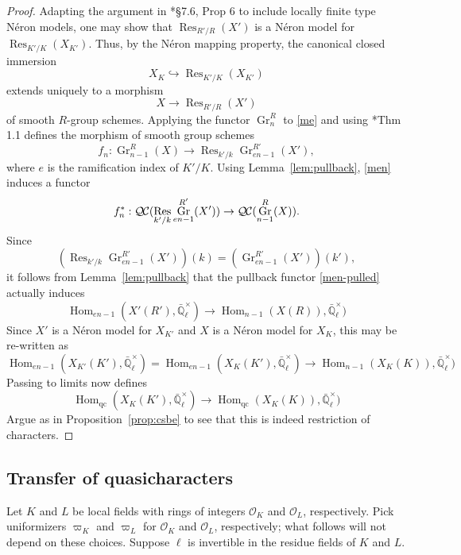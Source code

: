 \documentclass[CM,Submssn,SecEq]{degruyter-crelle} %
\theoremstyle{plain}
\theoremstyle{definition}
\theoremstyle{remark}
\newcommand{\EE}{\mathbb{\bar Q}_\ell}
\newcommand{\OK}{\mathcal{O}_K}
\newcommand{\OL}{\mathcal{O}_L}
\newcommand{\Fq}{k}
\newcommand{\EEx}{\EE^\times}
\DeclareMathOperator{\Hom}{Hom}
\DeclareMathOperator{\Gr}{Gr}
\DeclareMathOperator{\Res}{Res}
\newcommand{\QC}{{\mathcal{Q\hskip-0.8pt C}}}
\begin{document}
\begin{proof}
Adapting the argument in \cite{bosch-lutkebohmert-reynaud:NeronModels}*{\S 7.6, Prop 6} to include locally finite type N\'eron models,
one may show that $\Res_{R'/R}(X')$ is a N\'eron model for $\Res_{K'/K}(X_{K'})$.
Thus, by the N\'eron mapping property, the canonical closed immersion
\[
X_K\hookrightarrow \Res_{K'/K}(X_{K'})
\]
 extends uniquely to a morphism
\begin{equation}\label{me}
X\to \Res_{R'/R}(X')
\end{equation}
 of smooth $R$-group schemes.
%
Applying the functor $\Gr^R_{n}$ to \eqref{me}
and using \cite{bertrapelle-gonzales:Greenberg}*{Thm 1.1} defines the morphism of smooth group schemes
\begin{equation}\label{men}
f_n: \Gr_{n-1}^R(X) \to \Res_{k'/k} \Gr_{en-1}^{R'}(X'),
\end{equation}
where $e$ is the ramification index of $K'/K$.
Using Lemma~\ref{lem:pullback}, \eqref{men} induces a functor 
\begin{equation}\label{men-pulled}
f_n^* : \QC(\Res_{k'/k} \Gr_{en-1}^{R'}(X'))\to \QC(\Gr_{n-1}^{R}(X)).
\end{equation}
Since 
\[
\left(\Res_{k'/k} \Gr_{en-1}^{R'}(X') \right)(\Fq) = \left(\Gr_{en-1}^{R'}(X')\right)(k'),
\]
it follows from Lemma~\ref{lem:pullback} that the pullback functor \eqref{men-pulled} actually induces
\[ 
\Hom_{en-1}(X'(R'),\EEx) \to \Hom_{n-1}(X(R)),\EEx)
\]
Since $X'$ is a N\'eron model for $X_{K'}$ and $X$ is a N\'eron model for $X_K$,
 this may be re-written as
 \[ 
\Hom_{en-1}(X_{K'}(K'),\EEx)= \Hom_{en-1}(X_{K}(K'),\EEx) \to \Hom_{n-1}(X_K(K)),\EEx)
\]
Passing to limits now defines
\[ 
\Hom_\text{qc}(X_K(K'),\EEx) \to \Hom_\text{qc}(X_K(K)),\EEx)
\]
Argue as in Proposition~\ref{prop:csbe} to see that this is indeed restriction of characters.
\end{proof}

\subsection{Transfer of quasicharacters}\label{ssec:transfer}

Let $K$ and $L$ be local fields with rings of integers $\OK$ and $\OL$, respectively. 
Pick uniformizers $\varpi_K$ and $\varpi_L$ for $\OK$ and $\OL$, respectively;
what follows will not depend on these choices.
Suppose $\ell$ is invertible in the residue fields of $K$ and $L$.
\end{document}
